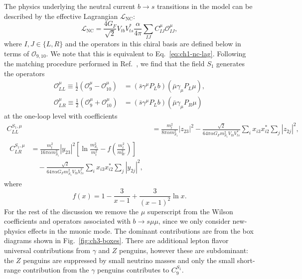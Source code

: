 The physics underlying the neutral current $b \rightarrow s$ transitions in the
model can be described by the effective Lagrangian $\mathscr{L}_{\text{NC}}$:
\begin{equation}
  \mathscr{L}_{\text{NC}} = \frac{4 G_F}{\sqrt{2}} V_{tb} V^*_{ts} \frac{\alpha}{4\pi} \sum_{IJ} C^\mu_{IJ}  \mathscr{O}^{\mu}_{IJ},
\end{equation}
where $I,J \in \{L, R\}$ and the operators in this chiral basis are defined
below in terms of $\mathscr{O}_{9,10}$. We note that this is equivalent to
Eq.~\eqref{eq:ch1-nc-lag}. Following the matching procedure performed in
Ref.~\cite{Misiak:1992bc}, we find that the field $S_{1}$ generates the
operators
\begin{equation}
  \begin{split}
  \mathscr{O}_{LL}^\mu \equiv
  \frac{1}{2}(\mathscr{O}_9^\mu - \mathscr{O}_{10}^\mu)
  &= (\bar{s}\gamma^\mu P_L b)(\bar{\mu} \gamma_\mu P_L \mu),\\
  \mathscr{O}_{LR}^\mu  \equiv
  \frac{1}{2}(\mathscr{O}_9^\mu + \mathscr{O}_{10}^\mu)
  &= (\bar{s}\gamma^\mu P_L
  b)(\bar{\mu}\gamma_\mu P_R \mu)
  \end{split}
\end{equation}
at the one-loop level with coefficients~\cite{Bauer:2015knc}
\begin{subequations} \label{eq:ch3-cllclreqs}
  \begin{align}
    C_{LL}^{S_{1},\mu} &= \frac{m_t^2}{8 \pi \alpha m_{S_{1}}^2}|z_{23}|^2 -
                         \frac{\sqrt{2}}{64\pi \alpha G_F m_{S_{1}}^2 V_{tb}V^*_{ts}}\sum_i x_{i 3}
                         x_{i 2}^* \sum_j |z_{2 j}|^2 , \label{eq:ch3-cll}\\
    \begin{split}
      C_{LR}^{S_{1},\mu} &= \frac{m_t^2}{16 \pi \alpha m_{S_{1}}^2}|y_{2 3}|^2
      \left[ \ln \frac{m_{S_{1}}^2}{m_t^2} - f \left( \frac{m_t^2}{m_W^2} \right)
      \right]\\ &\quad - \frac{\sqrt{2}}{64\pi \alpha G_F m_{S_{1}}^2
        V_{tb}V^*_{ts}}\sum_i x_{i 3} x_{i 2}^* \sum_j |y_{2 j}|^2, \label{eq:ch3-clr}
    \end{split}
  \end{align}
\end{subequations}
where
\begin{equation}
  f(x) = 1 - \frac{3}{x - 1} + \frac{3}{(x - 1)^2} \ln x.
\end{equation}
For the rest of the discussion we remove the $\mu$ superscript from the Wilson
coefficients and operators associated with $b \to s \mu \mu$, since we only
consider new-physics effects in the muonic mode. The dominant contributions are
from the box diagrams shown in Fig.~\ref{fig:ch3-boxes}. There are additional lepton
flavor universal contributions from $\gamma$ and $Z$ penguins, however these are
subdominant: the $Z$ penguins are suppressed by small neutrino masses and only
the small short-range contribution from the $\gamma$ penguins contributes to
$C^{S_{1}}_9$.

